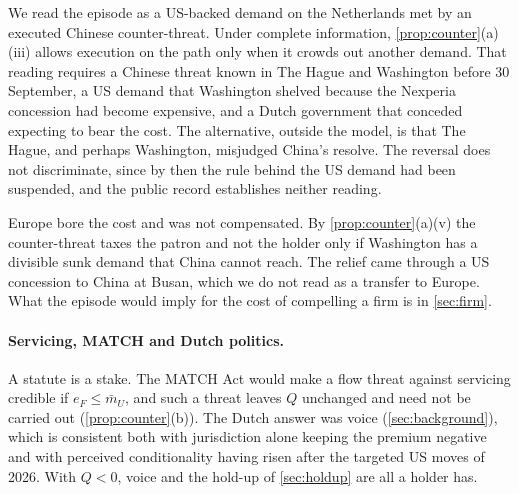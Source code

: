We read the episode as a US-backed demand on the Netherlands met by an executed Chinese counter-threat. Under complete information, \cref{prop:counter}(a)(iii) allows execution on the path only when it crowds out another demand. That reading requires a Chinese threat known in The Hague and Washington before 30 September, a US demand that Washington shelved because the Nexperia concession had become expensive, and a Dutch government that conceded expecting to bear the cost. The alternative, outside the model, is that The Hague, and perhaps Washington, misjudged China's resolve. The reversal does not discriminate, since by then the rule behind the US demand had been suspended, and the public record establishes neither reading.

Europe bore the cost and was not compensated. By \cref{prop:counter}(a)(v) the counter-threat taxes the patron and not the holder only if Washington has a divisible sunk demand that China cannot reach. The relief came through a US concession to China at Busan, which we do not read as a transfer to Europe. What the episode would imply for the cost of compelling a firm is in \cref{sec:firm}.

\paragraph{Servicing, MATCH and Dutch politics.} A statute is a stake. The MATCH Act would make a flow threat against servicing credible if $e_F\le\bar m_U$, and such a threat leaves $Q$ unchanged and need not be carried out (\cref{prop:counter}(b)). The Dutch answer was voice (\cref{sec:background}), which is consistent both with jurisdiction alone keeping the premium negative and with perceived conditionality having risen after the targeted US moves of 2026. With $Q<0$, voice and the hold-up of \cref{sec:holdup} are all a holder has.

